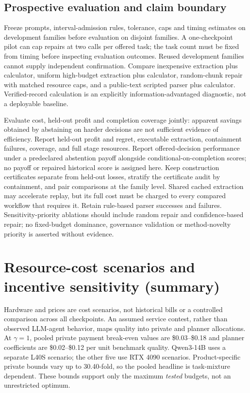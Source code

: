 \documentclass[sigconf,anonymous,nonacm]{acmart}
\begin{document}
\subsection{Prospective evaluation and claim boundary}
Freeze prompts, interval-admission rules, tolerance, caps and timing estimates on development families before evaluation on disjoint families. A one-checkpoint pilot can cap repairs at two calls per offered task; the task count must be fixed from timing before inspecting evaluation outcomes. Reused development families cannot supply independent confirmation. Compare inexpensive extraction plus calculator, uniform high-budget extraction plus calculator, random-chunk repair with matched resource caps, and a public-text scripted parser plus calculator. Verified-record calculation is an explicitly information-advantaged diagnostic, not a deployable baseline.

Evaluate cost, held-out profit and completion coverage jointly: apparent savings obtained by abstaining on harder decisions are not sufficient evidence of efficiency. Report held-out profit and regret, executable extraction, containment failures, coverage, and full stage resources. Report offered-decision performance under a predeclared abstention payoff alongside conditional-on-completion scores; no payoff or repaired historical score is assigned here. Keep construction certificates separate from held-out losses, stratify the certificate audit by containment, and pair comparisons at the family level. Shared cached extraction may accelerate replay, but its full cost must be charged to every compared workflow that requires it. Retain rule-based parser successes and failures. Sensitivity-priority ablations should include random repair and confidence-based repair; no fixed-budget dominance, governance validation or method-novelty priority is asserted without evidence.

\section{Resource-cost scenarios and incentive sensitivity (summary)}\label{sec:costsummary}
Hardware and prices are cost scenarios, not historical bills or a controlled comparison across all checkpoints. An assumed service contest, rather than observed LLM-agent behavior, maps quality into private and planner allocations. At $\gamma=1$, pooled private payment break-even values are \$0.03--\$0.18 and planner coefficients are \$0.02--\$0.12 per unit benchmark quality. Qwen3-14B uses a separate L40S scenario; the other five use RTX 4090 scenarios. Product-specific private bounds vary up to 30.40-fold, so the pooled headline is task-mixture dependent. These bounds support only the maximum \emph{tested} budgets, not an unrestricted optimum.
\end{document}
